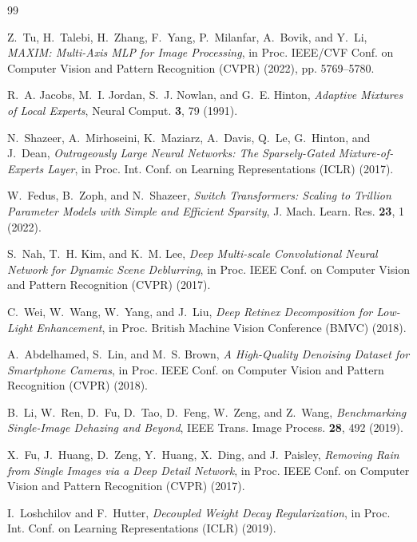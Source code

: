 \documentclass[aps,prl,twocolumn,groupedaddress]{revtex4-2}
\begin{document}
\begin{thebibliography}{99}

Z.~Tu, H.~Talebi, H.~Zhang, F.~Yang, P.~Milanfar, A.~Bovik, and Y.~Li,
\textit{MAXIM: Multi-Axis MLP for Image Processing},
in Proc. IEEE/CVF Conf. on Computer Vision and Pattern Recognition (CVPR) (2022), pp. 5769--5780.

R.~A. Jacobs, M.~I. Jordan, S.~J. Nowlan, and G.~E. Hinton,
\textit{Adaptive Mixtures of Local Experts},
Neural Comput. \textbf{3}, 79 (1991).

N.~Shazeer, A.~Mirhoseini, K.~Maziarz, A.~Davis, Q.~Le, G.~Hinton, and J.~Dean,
\textit{Outrageously Large Neural Networks: The Sparsely-Gated Mixture-of-Experts Layer},
in Proc. Int. Conf. on Learning Representations (ICLR) (2017).

W.~Fedus, B.~Zoph, and N.~Shazeer,
\textit{Switch Transformers: Scaling to Trillion Parameter Models with Simple and Efficient Sparsity},
J. Mach. Learn. Res. \textbf{23}, 1 (2022).

S.~Nah, T.~H. Kim, and K.~M. Lee,
\textit{Deep Multi-scale Convolutional Neural Network for Dynamic Scene Deblurring},
in Proc. IEEE Conf. on Computer Vision and Pattern Recognition (CVPR) (2017).

C.~Wei, W.~Wang, W.~Yang, and J.~Liu,
\textit{Deep Retinex Decomposition for Low-Light Enhancement},
in Proc. British Machine Vision Conference (BMVC) (2018).

A.~Abdelhamed, S.~Lin, and M.~S. Brown,
\textit{A High-Quality Denoising Dataset for Smartphone Cameras},
in Proc. IEEE Conf. on Computer Vision and Pattern Recognition (CVPR) (2018).

B.~Li, W.~Ren, D.~Fu, D.~Tao, D.~Feng, W.~Zeng, and Z.~Wang,
\textit{Benchmarking Single-Image Dehazing and Beyond},
IEEE Trans. Image Process. \textbf{28}, 492 (2019).

X.~Fu, J.~Huang, D.~Zeng, Y.~Huang, X.~Ding, and J.~Paisley,
\textit{Removing Rain from Single Images via a Deep Detail Network},
in Proc. IEEE Conf. on Computer Vision and Pattern Recognition (CVPR) (2017).

I.~Loshchilov and F.~Hutter,
\textit{Decoupled Weight Decay Regularization},
in Proc. Int. Conf. on Learning Representations (ICLR) (2019).


\end{thebibliography}
\end{document}
